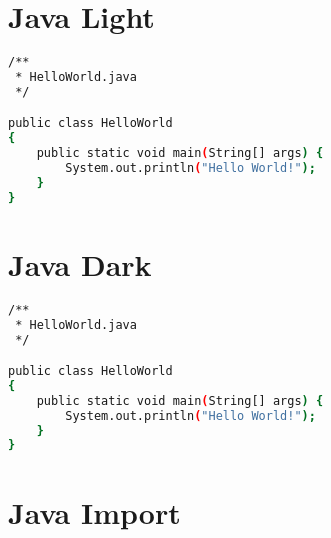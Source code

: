 \section{Java Light}

\begin{lstlisting}[language=bash, style=customStyleJavaLight, caption=Snippet title]
/**
 * HelloWorld.java
 */

public class HelloWorld
{
	public static void main(String[] args) {
		System.out.println("Hello World!");
	}
}
\end{lstlisting}

\section{Java Dark}

\begin{lstlisting}[language=bash, style=customStyleJavaDark, caption=Snippet title]
/**
 * HelloWorld.java
 */

public class HelloWorld
{
	public static void main(String[] args) {
		System.out.println("Hello World!");
	}
}
\end{lstlisting}

\section{Java Import}

